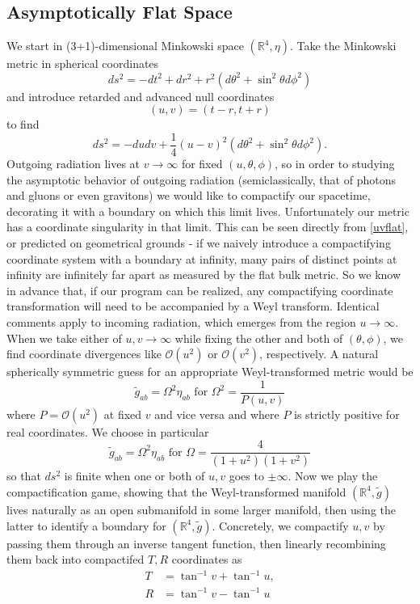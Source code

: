 \documentclass[11pt,letterpaper]{article}
\newcommand{\mc}[1]{\mathcal{#1}}
\newcommand{\R}{\mathbb{R}}
\begin{document}
\subsection{Asymptotically Flat Space}
We start in (3+1)-dimensional Minkowski space $(\R^4, \eta)$. Take the Minkowski metric in spherical coordinates \begin{equation}
ds^2 = - dt^2 + dr^2 + r^2 (d \theta^2 + \sin^2 \theta d \phi^2)
\end{equation}
and introduce retarded and advanced null coordinates \begin{equation}
(u,v) = (t - r, t + r)
\end{equation}
to find \begin{equation}\label{uvflat}
ds^2 = - du dv + \frac{1}{4} (u-v)^2 (d \theta^2 + \sin^2 \theta d \phi^2).
\end{equation}
Outgoing radiation lives at $v \to \infty$ for fixed $(u,\theta, \phi)$, so in order to studying the asymptotic behavior of outgoing radiation (semiclassically, that of photons and gluons or even gravitons) we would like to compactify our spacetime, decorating it with a boundary on which this limit lives. Unfortunately our metric has a coordinate singularity in that limit. This can be seen directly from \eqref{uvflat}, or predicted on geometrical grounds - if we naively introduce a compactifying coordinate system with a boundary at infinity, many pairs of distinct points at infinity are infinitely far apart as measured by the flat bulk metric. So we know in advance that, if our program can be realized, any compactifying coordinate transformation will need to be accompanied by a Weyl transform. Identical comments apply to incoming radiation, which emerges from the region $u \to \infty$. When we take either of $u, v \to \infty$ while fixing the other and both of $(\theta, \phi)$, we find coordinate divergences like $\mathcal{O}(u^2)$ or $\mathcal{O}(v^2)$, respectively. A natural spherically symmetric guess for an appropriate Weyl-transformed metric would be \begin{equation}
\tilde{g}_{ab} = \Omega^2 \eta_{ab} \mbox{ for } \Omega^2 = \frac{1}{P(u,v)}
\end{equation}
where $P = \mc{O}(u^2)$ at fixed $v$ and vice versa and where $P$ is strictly positive for real coordinates. We choose in particular \begin{equation}
\tilde{g}_{ab} = \Omega^2 \eta_{ab} \mbox{ for } \Omega = \frac{4}{(1 + u^2)(1 + v^2)}
\end{equation}
so that $ds^2$ is finite when one or both of $u,v$ goes to $\pm \infty$. Now we play the compactification game, showing that the Weyl-transformed manifold $(\R^4, \tilde{g})$ lives naturally as an open submanifold in some larger manifold, then using the latter to identify a boundary for $(\R^4, \tilde{g})$. Concretely, we compactify $u,v$ by passing them through an inverse tangent function, then linearly recombining them back into compactifed $T,R$ coordinates as \begin{equation}
\begin{aligned}
T & = \tan^{-1} v + \tan^{-1} u, \\
R & = \tan^{-1} v - \tan^{-1} u
\end{aligned}
\end{equation}
\end{document}
